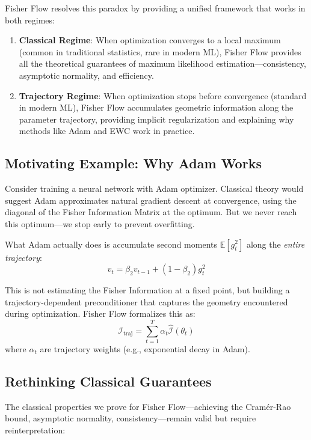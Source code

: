\documentclass[11pt]{article}
\begin{document}
Fisher Flow resolves this paradox by providing a unified framework that works in both regimes:

\begin{enumerate}
\item \textbf{Classical Regime}: When optimization converges to a local maximum (common in traditional statistics, rare in modern ML), Fisher Flow provides all the theoretical guarantees of maximum likelihood estimation—consistency, asymptotic normality, and efficiency.

\item \textbf{Trajectory Regime}: When optimization stops before convergence (standard in modern ML), Fisher Flow accumulates geometric information along the parameter trajectory, providing implicit regularization and explaining why methods like Adam and EWC work in practice.
\end{enumerate}

\subsection*{Motivating Example: Why Adam Works}

Consider training a neural network with Adam optimizer. Classical theory would suggest Adam approximates natural gradient descent at convergence, using the diagonal of the Fisher Information Matrix at the optimum. But we never reach this optimum—we stop early to prevent overfitting.

What Adam actually does is accumulate second moments $\mathbb{E}[g_t^2]$ along the \emph{entire trajectory}:
\begin{equation}
v_t = \beta_2 v_{t-1} + (1-\beta_2) g_t^2
\end{equation}

This is not estimating the Fisher Information at a fixed point, but building a trajectory-dependent preconditioner that captures the geometry encountered during optimization. Fisher Flow formalizes this as:
\begin{equation}
\mathcal{I}_{\text{traj}} = \sum_{t=1}^T \alpha_t \hat{\mathcal{I}}(\theta_t)
\end{equation}
where $\alpha_t$ are trajectory weights (e.g., exponential decay in Adam).

\subsection*{Rethinking Classical Guarantees}

The classical properties we prove for Fisher Flow—achieving the Cramér-Rao bound, asymptotic normality, consistency—remain valid but require reinterpretation:
\end{document}
